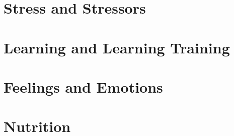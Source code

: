 \documentclass[makeidx]{book}
\begin{document}
\doparttoc
\frontmatter



% 


\mainmatter
\part{Stress and Stressors}
\parttoc
%

\part{Learning and Learning Training}

\parttoc
%

\part{Feelings and Emotions}

\parttoc
%

\part{Nutrition}
\parttoc


\label{part:medicine}



{}

\backmatter
\label{index}\printindex
\end{document}
